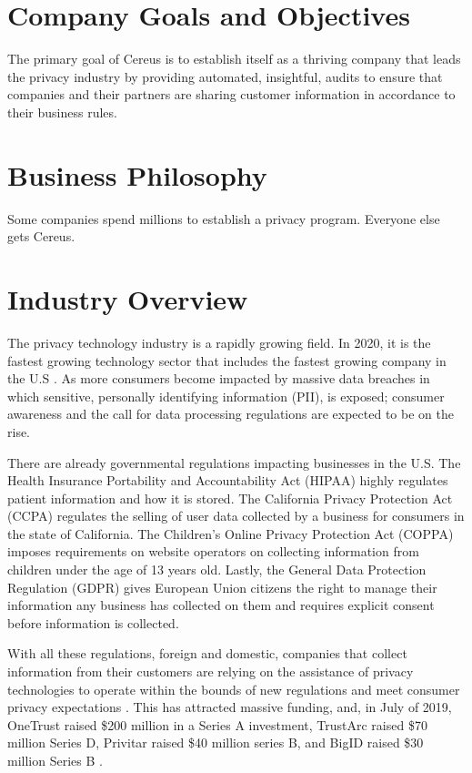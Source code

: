 \section{Company Goals and Objectives}

The primary goal of Cereus is to establish itself as a thriving company that leads the privacy industry by providing automated, insightful, audits to ensure that companies and their partners are sharing customer information in accordance to their business rules.

\section{Business Philosophy}

Some companies spend millions to establish a privacy program. Everyone else gets Cereus.

\section{Industry Overview}

The privacy technology industry is a rapidly growing field. In 2020, it is the fastest growing technology sector that includes the fastest growing company in the U.S \cite{hughes.iapp.2020}. As more consumers become impacted by massive data breaches in which sensitive, personally identifying information (PII), is exposed; consumer awareness and the call for data processing regulations are expected to be on the rise.

There are already governmental regulations impacting businesses in the U.S. The Health Insurance Portability and Accountability Act (HIPAA) highly regulates patient information and how it is stored. The California Privacy Protection Act (CCPA) regulates the selling of user data collected by a business for consumers in the state of California. The Children's Online Privacy Protection Act (COPPA) imposes requirements on website operators on collecting information from children under the age of 13 years old. Lastly, the General Data Protection Regulation (GDPR) gives European Union citizens the right to manage their information any business has collected on them and requires explicit consent before information is collected.

With all these regulations, foreign and domestic, companies that collect information from their customers are relying on the assistance of privacy technologies to operate within the bounds of new regulations and meet consumer privacy expectations \cite{meehan.forbes.2019}. This has attracted massive funding, and, in July of 2019, OneTrust raised \$200 million in a Series A investment, TrustArc raised \$70 million Series D, Privitar raised \$40 million series B, and BigID raised \$30 million Series B \cite{wood.fpf.2019}.

